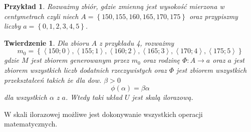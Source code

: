 \documentclass[12pt,a4paper]{report}
\newtheorem{przyklad}{Przykład}
\newtheorem{tw}[definition]{Twierdzenie}
\newcommand{\parauporzadkowana}[2]{\left\langle {#1}; {#2} \right\rangle}
\newcommand{\zbior}[1]{\left\lbrace {#1} \right\rbrace }
\begin{document}
\begin{przyklad}
Rozważmy zbiór, gdzie zmienną jest wysokość mierzona w centymetrach czyli niech $A=\zbior{150,155,160,165,170,175}$ oraz przypiszmy liczby $a=\zbior{0,1,2,3,4,5}$. 
\end{przyklad}
\begin{tw}
Dla zbioru $A$ z przykładu 4, rozważmy
$$
m_{0}=\zbior{\parauporzadkowana{150}{0},\parauporzadkowana{155}{1},\parauporzadkowana{160}{2},\parauporzadkowana{165}{3},\parauporzadkowana{170}{4},\parauporzadkowana{175}{5}}
$$
 gdzie $M$ jest zbiorem generowanym przez $m_{0}$ oraz rodzinę $\Phi \colon A \to a$ oraz $a$ jest zbiorem wszystkich liczb dodatnich rzeczywistych oraz $\Phi$ jest zbiorem wszystkich przekształceń takich że dla dow. $\beta>0$
\begin{equation*}
\phi(\alpha)=\beta\alpha
\end{equation*}
dla wszystkich $\alpha$ z $a$. Wtedy taki układ $U$ jest skalą ilorazową.
\end{tw}
W skali ilorazowej możliwe jest dokonywanie wszystkich operacji matematycznych.
\end{document}
